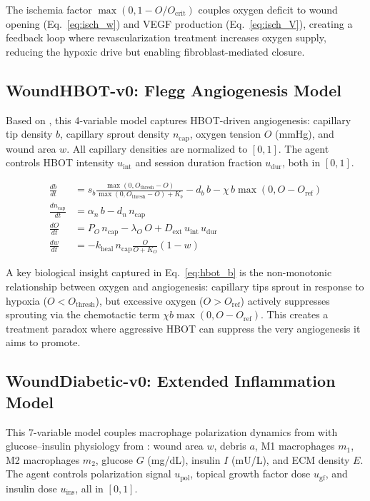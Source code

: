 \documentclass[11pt,a4paper]{article}
\begin{document}
The ischemia factor $\max(0, 1 - O/O_{\text{crit}})$ couples oxygen deficit to wound opening (Eq.~\ref{eq:isch_w}) and VEGF production (Eq.~\ref{eq:isch_V}), creating a feedback loop where revascularization treatment increases oxygen supply, reducing the hypoxic drive but enabling fibroblast-mediated closure.

\subsection{WoundHBOT-v0: Flegg Angiogenesis Model}

Based on \citet{flegg2009, flegg2010}, this 4-variable model captures HBOT-driven angiogenesis: capillary tip density $b$, capillary sprout density $n_{\text{cap}}$, oxygen tension $O$ (mmHg), and wound area $w$. All capillary densities are normalized to $[0, 1]$. The agent controls HBOT intensity $u_{\text{int}}$ and session duration fraction $u_{\text{dur}}$, both in $[0, 1]$.

\begin{align}
\frac{db}{dt} &= s_b \frac{\max(0, O_{\text{thresh}} - O)}{\max(0, O_{\text{thresh}} - O) + K_b} - d_b \, b - \chi \, b \max(0, O - O_{\text{ref}}) \label{eq:hbot_b} \\
\frac{dn_{\text{cap}}}{dt} &= \alpha_n \, b - d_n \, n_{\text{cap}} \label{eq:hbot_ncap} \\
\frac{dO}{dt} &= P_O \, n_{\text{cap}} - \lambda_O \, O + D_{\text{ext}} \, u_{\text{int}} \, u_{\text{dur}} \label{eq:hbot_O} \\
\frac{dw}{dt} &= -k_{\text{heal}} \, n_{\text{cap}} \frac{O}{O + K_O} (1 - w) \label{eq:hbot_w}
\end{align}

A key biological insight captured in Eq.~\eqref{eq:hbot_b} is the non-monotonic relationship between oxygen and angiogenesis: capillary tips sprout in response to hypoxia ($O < O_{\text{thresh}}$), but excessive oxygen ($O > O_{\text{ref}}$) actively suppresses sprouting via the chemotactic term $\chi b \max(0, O - O_{\text{ref}})$. This creates a treatment paradox where aggressive HBOT can suppress the very angiogenesis it aims to promote.

\subsection{WoundDiabetic-v0: Extended Inflammation Model}

This 7-variable model couples macrophage polarization dynamics from \citet{zlobina2022} with glucose--insulin physiology from \citet{waugh2006}: wound area $w$, debris $a$, M1 macrophages $m_1$, M2 macrophages $m_2$, glucose $G$ (mg/dL), insulin $I$ (mU/L), and ECM density $E$. The agent controls polarization signal $u_{\text{pol}}$, topical growth factor dose $u_{\text{gf}}$, and insulin dose $u_{\text{ins}}$, all in $[0, 1]$.
\end{document}
